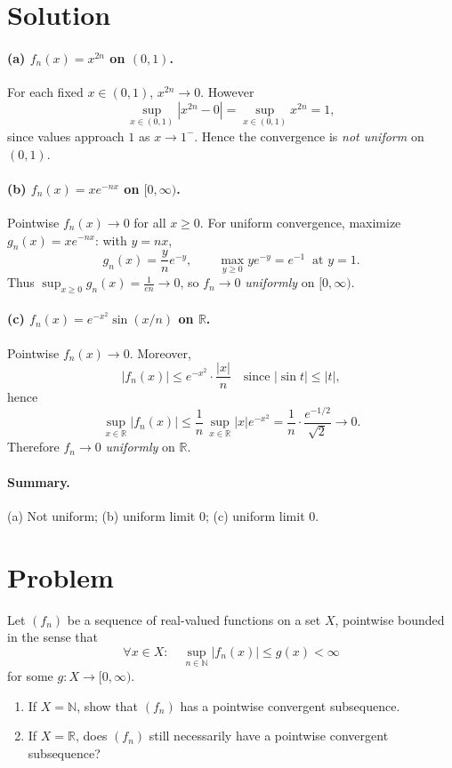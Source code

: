 \documentclass[12pt,a4paper]{article}
\begin{document}
\section*{Solution}

\paragraph{(a) $f_n(x)=x^{2n}$ on $(0,1)$.}
For each fixed $x\in(0,1)$, $x^{2n}\to 0$. However
\[
\sup_{x\in(0,1)}|x^{2n}-0|=\sup_{x\in(0,1)} x^{2n}=1,
\]
since values approach $1$ as $x\to1^{-}$. Hence the convergence is \emph{not uniform} on $(0,1)$.

\paragraph{(b) $f_n(x)=x e^{-nx}$ on $[0,\infty)$.}
Pointwise $f_n(x)\to 0$ for all $x\ge0$. For uniform convergence, maximize $g_n(x)=x e^{-nx}$:
with $y=nx$,
\[
g_n(x)=\frac{y}{n}e^{-y},\qquad \max_{y\ge0} y e^{-y}=e^{-1}\ \text{ at }y=1.
\]
Thus $\sup_{x\ge0} g_n(x)=\frac{1}{en}\to 0$, so $f_n\to 0$ \emph{uniformly} on $[0,\infty)$.

\paragraph{(c) $f_n(x)=e^{-x^2}\sin(x/n)$ on $\mathbb{R}$.}
Pointwise $f_n(x)\to 0$. Moreover,
\[
|f_n(x)|\le e^{-x^2}\cdot\frac{|x|}{n}\quad\text{since }|\sin t|\le |t|,
\]
hence
\[
\sup_{x\in\mathbb{R}}|f_n(x)|
\le \frac{1}{n}\,\sup_{x\in\mathbb{R}} |x|e^{-x^2}
= \frac{1}{n}\cdot \frac{e^{-1/2}}{\sqrt{2}}
\longrightarrow 0.
\]
Therefore $f_n\to 0$ \emph{uniformly} on $\mathbb{R}$.

\paragraph{Summary.}
(a) Not uniform; (b) uniform limit $0$; (c) uniform limit $0$.

\section*{Problem}
Let $(f_n)$ be a sequence of real-valued functions on a set $X$, pointwise bounded in the sense that
\[
\forall x\in X:\quad \sup_{n\in\mathbb{N}} |f_n(x)| \le g(x) < \infty
\]
for some $g:X\to[0,\infty)$.
\begin{enumerate}[label=(\alph*)]
	\item If $X=\mathbb{N}$, show that $(f_n)$ has a pointwise convergent subsequence.
	\item If $X=\mathbb{R}$, does $(f_n)$ still necessarily have a pointwise convergent subsequence?
\end{enumerate}
\end{document}

